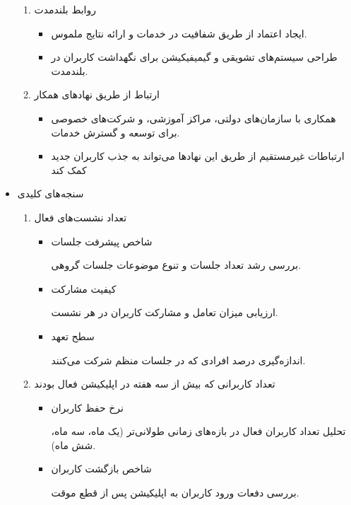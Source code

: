 \documentclass[dvipsnames, svgnames, x11names, 11pt]{article}
\begin{document}
\begin{itemize}
\begin{enumerate}
\item 
روابط بلندمدت

\begin{itemize}
\item 
ایجاد اعتماد از طریق شفافیت در خدمات و ارائه نتایج ملموس.
\item 
طراحی سیستم‌های تشویقی و گیمیفیکیشن برای نگهداشت کاربران در بلندمدت.
\end{itemize}

\item 
ارتباط از طریق نهادهای همکار

\begin{itemize}
\item 
همکاری با سازمان‌های دولتی، مراکز آموزشی، و شرکت‌های خصوصی برای توسعه و گسترش خدمات.
\item 
ارتباطات غیرمستقیم از طریق این نهادها می‌تواند به جذب کاربران جدید کمک کند
\end{itemize}
\end{enumerate}

\item 
سنجه‌های کلیدی

\begin{enumerate}
\item 
تعداد نشست‌های فعال  

\begin{itemize}
\item 
شاخص پیشرفت جلسات

بررسی رشد تعداد جلسات و تنوع موضوعات جلسات گروهی.  

\item 
کیفیت مشارکت

ارزیابی میزان تعامل و مشارکت کاربران در هر نشست.  

\item 
سطح تعهد

اندازه‌گیری درصد افرادی که در جلسات منظم شرکت می‌کنند.  
\end{itemize}

\item 
تعداد کاربرانی که بیش از سه هفته در اپلیکیشن فعال بودند  
\begin{itemize}
\item 
نرخ حفظ کاربران

تحلیل تعداد کاربران فعال در بازه‌های زمانی طولانی‌تر (یک ماه، سه ماه، شش ماه).  

\item 
شاخص بازگشت کاربران

بررسی دفعات ورود کاربران به اپلیکیشن پس از قطع موقت.  


\end{itemize}
\end{enumerate}
\end{itemize}
\end{document}

